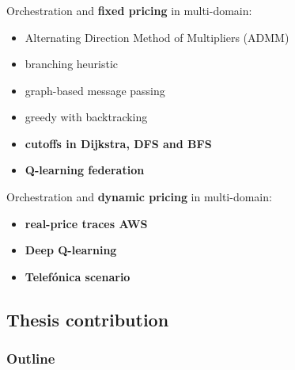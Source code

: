 \documentclass[aspectratio=169]{beamer}
\begin{document}
\begin{frame}
    \frametitle{\secname}
    \framesubtitle{\subsecname}



    Orchestration and \textbf{fixed pricing} in multi-domain:
    \begin{itemize}
        \item Alternating Direction Method of Multipliers (ADMM)~\cite{ad3Distributed}
        \item branching heuristic~\cite{consolidation}
        \item graph-based message passing~\cite{vertex-centric}
        \item greedy with backtracking~\cite{balazsEmbedding} \pause
        \item \textbf{\color{red}cutoffs in Dijkstra, DFS and BFS~\cite{multi-domain-msc}}
        \item \textbf{\color{red}Q-learning federation~\cite{icc}}
    \end{itemize} \pause
    Orchestration and \textbf{\color{red}dynamic pricing} in multi-domain: \pause
    \begin{itemize}
        \item \textbf{\color{red}real-price traces AWS}\pause
        \item \textbf{\color{red}Deep Q-learning}\pause
        \item \textbf{\color{red}Telefónica scenario}
    \end{itemize}
\end{frame}



\subsection{Thesis contribution}
\begin{frame}
    \frametitle{Outline}
    \tableofcontents[subsectionstyle=show/shaded/hide,sectionstyle=show/shaded]
\end{frame}
\end{document}
